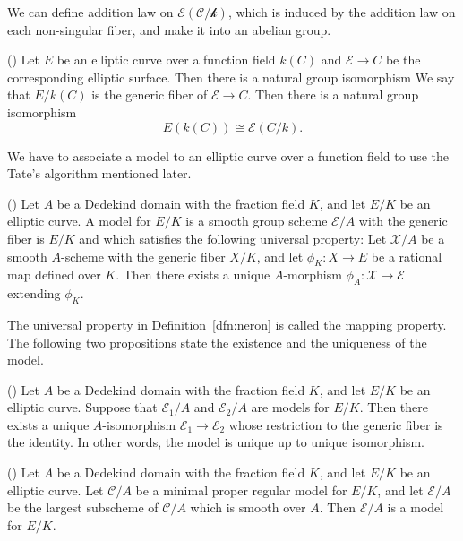 \documentclass[main]{subfiles}
\begin{document}
We can define addition law on $\mathcal{E(C/k)}$, which is induced by the addition law on each non-singular fiber, and make it into an abelian group.
\begin{prop}{(\cite[Proposition III.3.10. (c)]{ref:advancedaec})}
    Let $E$ be an elliptic curve over a function field $k(C)$ and $\mathcal{E} \to C$ be the corresponding elliptic surface.
    Then there is a natural group isomorphism
    We say that $E/k(C)$ is the generic fiber of $\mathcal{E} \to C$.
    Then there is a natural group isomorphism
    \begin{equation*}
        E(k(C)) \cong \mathcal{E}(C/k).
    \end{equation*}
\end{prop}


We have to associate a \Neron{} model to an elliptic curve over a function field to use the Tate's algorithm mentioned later.

\begin{dfn}{(\cite[IV\S 5 Definition]{ref:advancedaec})}
    \label{dfn:neron}
    Let $A$ be a Dedekind domain with the fraction field $K$, and let $E/K$ be an elliptic curve.
    A \Neron{} model for $E/K$ is a smooth group scheme $\mathcal{E}/A$ with the generic fiber is $E/K$ and which satisfies the following universal property:
    Let $\mathcal{X}/A$ be a smooth $A$-scheme with the generic fiber $X/K$, and let $\phi_K: X \to E$ be a rational map defined over $K$.
    Then there exists a unique $A$-morphism $\phi_A: \mathcal{X} \to \mathcal{E}$ extending $\phi_K$.
\end{dfn}
The universal property in Definition~\ref{dfn:neron} is called the \Neron{} mapping property.
The following two propositions state the existence and the uniqueness of the \Neron{} model.
\begin{prop}{(\cite[Proposition IV.5.2. (a)]{ref:advancedaec})}
    Let $A$ be a Dedekind domain with the fraction field $K$, and let $E/K$ be an elliptic curve.
    Suppose that $\mathcal{E}_1/A$ and $\mathcal{E}_2/A$ are \Neron{} models for $E/K$.
    Then there exists a unique $A$-isomorphism $\mathcal{E}_1 \to \mathcal{E}_2$ whose restriction to the generic fiber is the identity.
    In other words, the \Neron{} model is unique up to unique isomorphism.
\end{prop}

\begin{prop}{(\cite[Theorem IV.6.1.]{ref:advancedaec})}
    Let $A$ be a Dedekind domain with the fraction field $K$, and let $E/K$ be an elliptic curve.
    Let $\mathcal{C}/A$ be a minimal proper regular model for $E/K$, and let $\mathcal{E}/A$ be the largest subscheme of $\mathcal{C}/A$ which is smooth over $A$.
    Then $\mathcal{E}/A$ is a \Neron{} model for $E/K$.
\end{prop}
\end{document}
